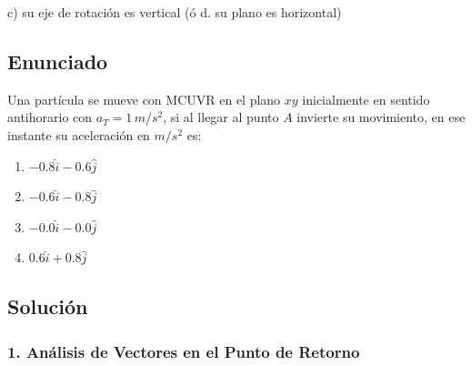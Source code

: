 \documentclass[12pt, a4paper]{article}
\begin{document}
\begin{tcolorbox}[colback=green!5!white, colframe=green!50!black, title=Respuesta Final]
\centering \Large c) su eje de rotación es vertical (ó d. su plano es horizontal)
\end{tcolorbox}

\newpage

\subsection*{Enunciado}
Una partícula se mueve con MCUVR en el plano $xy$ inicialmente en sentido antihorario con $a_T = 1\,\si{m/s^2}$, si al llegar al punto $A$ invierte su movimiento, en ese instante su aceleración en $\si{m/s^2}$ es:

\begin{center}
\end{center}

\begin{enumerate}[label=\alph*)]
    \item $-0.8\hat{i} - 0.6\hat{j}$
    \item $-0.6\hat{i} - 0.8\hat{j}$
    \item $-0.0\hat{i} - 0.0\hat{j}$
    \item $0.6\hat{i} + 0.8\hat{j}$
\end{enumerate}

\subsection*{Solución}

\subsubsection*{1. Análisis de Vectores en el Punto de Retorno}
\end{document}
